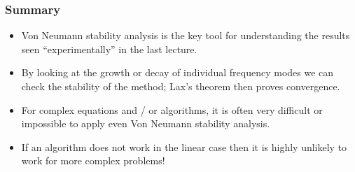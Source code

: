 \documentclass{beamer}
\begin{document}
\begin{frame}
  \frametitle{Summary}

  \begin{itemize}
  \item Von Neumann stability analysis is the key tool for
    understanding the results seen ``experimentally'' in the last
    lecture.
  \item By looking at the growth or decay of individual frequency
    modes we can check the stability of the method; Lax's theorem then
    proves convergence.
  \item For complex equations and / or algorithms, it is often very
    difficult or impossible to apply even Von Neumann stability
    analysis.
  \item If an algorithm does not work in the linear case then it is
    highly unlikely to work for more complex problems!
  \end{itemize}

\end{frame}
\end{document}
